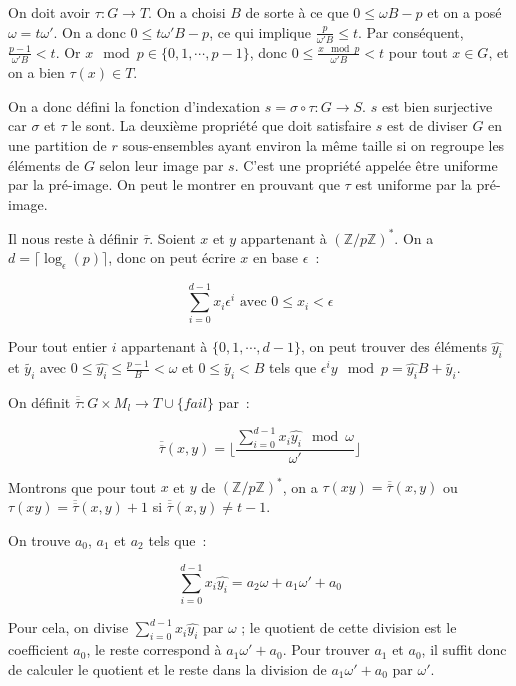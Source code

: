     On doit avoir $\tau : G \longrightarrow T$. On a choisi $B$ de sorte à ce que $0 \leq \omega B - p$ et on a posé $\omega = t\omega'$. On a donc $0 \leq t \omega' B - p$, ce qui implique $\frac{p}{\omega' B} \leq t$. Par conséquent, $\frac{p-1}{\omega' B} < t$. Or $x\mod p \in \{0,1,\cdots,p-1\}$, donc $0 \leq \frac{x\mod p}{\omega' B} < t$ pour tout $x \in G$, et on a bien $\tau(x) \in T$.

    On a donc défini la fonction d'indexation $s = \sigma \circ \tau : G \longrightarrow S$. $s$ est bien surjective car $\sigma$ et $\tau$ le sont. La deuxième propriété que doit satisfaire $s$ est de diviser $G$ en une partition de $r$ sous-ensembles ayant environ la même taille si on regroupe les éléments de $G$ selon leur image par $s$. C'est une propriété appelée être uniforme par la pré-image. On peut le montrer en prouvant que $\tau$ est uniforme par la pré-image.

    Il nous reste à définir $\overline{\tau}$. Soient $x$ et $y$ appartenant à $(\mathbb{Z}/p\mathbb{Z})^*$. On a $d = \lceil\log_\epsilon(p)\rceil$, donc on peut écrire $x$ en base $\epsilon$~:

    $$ \sum_{i=0}^{d-1} x_i \epsilon^i \text{ avec $0 \leq x_i < \epsilon$} $$

    Pour tout entier $i$ appartenant à $\{0,1,\cdots,d-1\}$, on peut trouver des éléments $\hat{y_i}$ et $\tilde{y_i}$ avec $0 \leq \hat{y_i} \leq \frac{p-1}{B} < \omega$ et $0 \leq \tilde{y_i} < B$ tels que $\epsilon^i y\mod p = \hat{y_i} B + \tilde{y_i}$.

    On définit $\overline{\overline{\tau}} : G \times M_l \longrightarrow T \cup \{fail\}$ par~:

    $$\overline{\overline{\tau}}(x,y) = \lfloor \frac{\sum_{i=0}^{d-1} x_i \hat{y_i}\mod \omega}{\omega'} \rfloor$$

    Montrons que pour tout $x$ et $y$ de $(\mathbb{Z}/p\mathbb{Z})^*$, on a $\tau(xy) = \overline{\overline{\tau}}(x,y)$ ou $\tau(xy) = \overline{\overline{\tau}}(x,y) + 1$ si $\overline{\overline{\tau}}(x,y) \neq t - 1$.

    On trouve $a_0$, $a_1$ et $a_2$ tels que~:

    $$ \sum_{i=0}^{d-1} x_i \hat{y_i} = a_2\omega + a_1\omega' + a_0 $$

    Pour cela, on divise $\sum_{i=0}^{d-1} x_i \hat{y_i}$ par $\omega$ ; le quotient de cette division est le coefficient $a_0$, le reste correspond à $a_1\omega' + a_0$. Pour trouver $a_1$ et $a_0$, il suffit donc de calculer le quotient et le reste dans la division de $a_1\omega' + a_0$ par $\omega'$.

